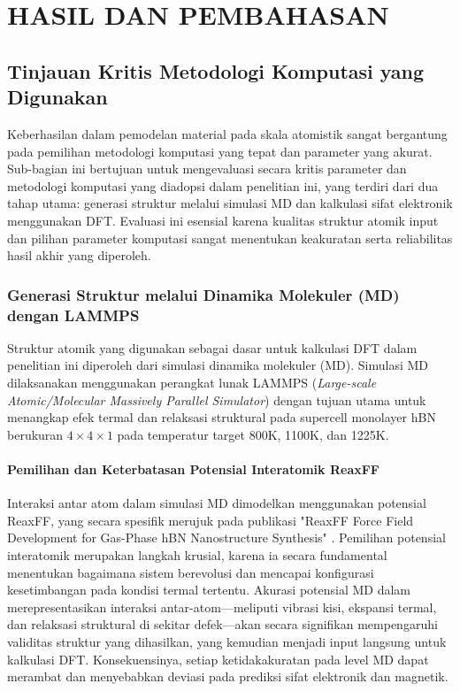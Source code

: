 \renewcommand{\thechapter}{\Roman{chapter}}
\chapter{HASIL DAN PEMBAHASAN}
\renewcommand{\thechapter}{\arabic{chapter}}

\section{Tinjauan Kritis Metodologi Komputasi yang Digunakan}
\label{sec:metodologi_kritis}
Keberhasilan dalam pemodelan material pada skala atomistik sangat bergantung pada pemilihan metodologi komputasi yang tepat dan parameter yang akurat. Sub-bagian ini bertujuan untuk mengevaluasi secara kritis parameter dan metodologi komputasi yang diadopsi dalam penelitian ini, yang terdiri dari dua tahap utama: generasi struktur melalui simulasi MD dan kalkulasi sifat elektronik menggunakan DFT. Evaluasi ini esensial karena kualitas struktur atomik input dan pilihan parameter komputasi sangat menentukan keakuratan serta reliabilitas hasil akhir yang diperoleh.

\subsection{Generasi Struktur melalui Dinamika Molekuler (MD) dengan LAMMPS}
\label{subsec:md_lammps}
Struktur atomik yang digunakan sebagai dasar untuk kalkulasi DFT dalam penelitian ini diperoleh dari simulasi dinamika molekuler (MD). Simulasi MD dilaksanakan menggunakan perangkat lunak LAMMPS (\textit{Large-scale Atomic/Molecular Massively Parallel Simulator}) \citep{Plimpton1995} dengan tujuan utama untuk menangkap efek termal dan relaksasi struktural pada supercell monolayer hBN berukuran $4 \times 4 \times 1$ pada temperatur target 800K, 1100K, dan 1225K.

\subsubsection{Pemilihan dan Keterbatasan Potensial Interatomik ReaxFF}
Interaksi antar atom dalam simulasi MD dimodelkan menggunakan potensial ReaxFF, yang secara spesifik merujuk pada publikasi "ReaxFF Force Field Development for Gas-Phase hBN Nanostructure Synthesis" \citep{Lele2022}. Pemilihan potensial interatomik merupakan langkah krusial, karena ia secara fundamental menentukan bagaimana sistem berevolusi dan mencapai konfigurasi kesetimbangan pada kondisi termal tertentu. Akurasi potensial MD dalam merepresentasikan interaksi antar-atom—meliputi vibrasi kisi, ekspansi termal, dan relaksasi struktural di sekitar defek—akan secara signifikan mempengaruhi validitas struktur yang dihasilkan, yang kemudian menjadi input langsung untuk kalkulasi DFT. Konsekuensinya, setiap ketidakakuratan pada level MD dapat merambat dan menyebabkan deviasi pada prediksi sifat elektronik dan magnetik.

